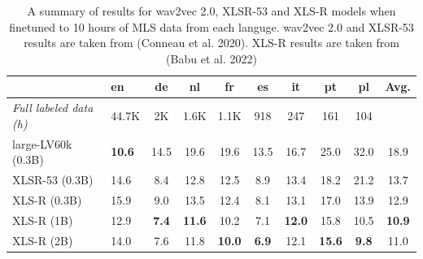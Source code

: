 \begin{table}[t]
\centering
\begin{tabular}{llcccccccc}
\hline
  & en & de & nl & fr & es & it & pt & pl & Avg. \\
\hline
\textit{Full labeled data (h)}  & 44.7K & 2K & 1.6K & 1.1K & 918 & 247 & 161 & 104 &  \\
\hline
large-LV60k (0.3B) \cite{XLSR-53} & \textbf{10.6} & 14.5 & 19.6 & 19.6 & 13.5 & 16.7 & 25.0 & 32.0 & 18.9  \\
XLSR-53 (0.3B) \cite{XLSR-53} & 14.6 & 8.4 & 12.8 & 12.5 & 8.9 & 13.4 & 18.2 & 21.2 & 13.7 \\ %
XLS-R (0.3B) \cite{babu2021xlsr}  & 15.9 & 9.0 & 13.5 & 12.4 & 8.1 & 13.1 & 17.0 & 13.9 & 12.9 \\ %
XLS-R (1B) \cite{babu2021xlsr} & 12.9 & \textbf{7.4} & \textbf{11.6} & 10.2 & 7.1 & \textbf{12.0} & 15.8 & 10.5 & \textbf{10.9} \\
XLS-R (2B) \cite{babu2021xlsr} & 14.0 & 7.6 & 11.8 & \textbf{10.0} & \textbf{6.9} & 12.1 & \textbf{15.6} & \textbf{9.8} & 11.0 \\
\hline
\end{tabular}
\caption{A summary of results for wav2vec 2.0, XLSR-53 and XLS-R models when finetuned to 10 hours of MLS data from each languge. wav2vec 2.0 and XLSR-53 results are taken from (Conneau et al. 2020). XLS-R results are taken from (Babu et al. 2022)}
\label{lr_tab:xlsr_xlsr_53_mls}
\end{table}

